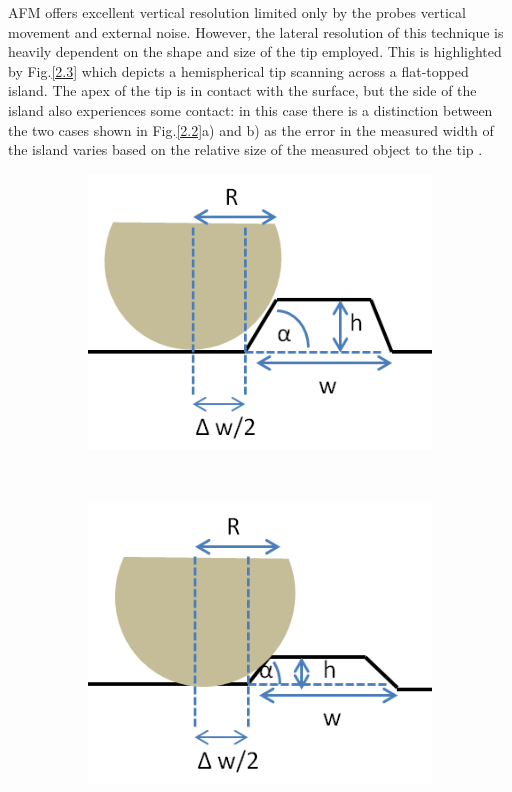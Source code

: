 AFM offers excellent vertical resolution limited only by the probes vertical movement and external noise. However, the lateral resolution of this technique is heavily dependent on the shape and size of the tip employed. This is highlighted by Fig.\ref{2.3} which depicts a hemispherical tip scanning across a flat-topped island. The apex of the tip is in contact with the surface, but the side of the island also experiences some contact: in this case there is a distinction between the two cases shown in Fig.\ref{2.2}a) and b) as the error in the measured width of the island varies based on the relative size of the measured object to the tip \cite{Oliver2008}.

\begin{figure}[h]
	\begin{subfigure}[t]{0.4\textwidth}
		\centering
		\includegraphics[width = 1\textwidth]{Figs/Ch2/afm1.png}
		\caption{}
	\end{subfigure}%
	\hspace*{1cm}
	~	
	\begin{subfigure}[t]{0.4\textwidth}
		\centering
		\includegraphics[width=1\textwidth]{Figs/Ch2/afm2.png}

\end{subfigure}
\end{figure}
